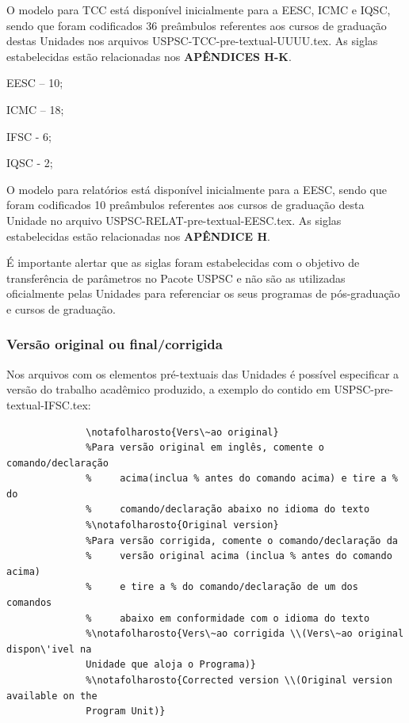 O modelo para TCC está disponível inicialmente para a EESC, ICMC e IQSC, sendo que foram codificados 36 preâmbulos referentes aos cursos de graduação destas Unidades nos arquivos USPSC-TCC-pre-textual-UUUU.tex. As siglas estabelecidas estão relacionadas nos \textbf{APÊNDICES H-K}.
				\begin{alineas}
					\item EESC – 10;
					\item  ICMC – 18;
					\item  IFSC - 6;
					\item  IQSC - 2;
				\end{alineas}	
	  						
O modelo para relatórios está disponível inicialmente para a EESC, sendo que foram codificados 10 preâmbulos referentes aos cursos de graduação desta Unidade no arquivo USPSC-RELAT-pre-textual-EESC.tex. As siglas estabelecidas estão relacionadas nos \textbf{APÊNDICE H}.

É importante alertar que as siglas foram estabelecidas com o objetivo de transferência de parâmetros no Pacote USPSC e não são as utilizadas oficialmente pelas Unidades para referenciar os seus programas de pós-graduação e cursos de graduação.

\subsubsection{Versão original ou final/corrigida}
Nos arquivos com os elementos pré-textuais das Unidades é possível especificar a versão do trabalho acadêmico produzido, a exemplo do contido em USPSC-pre-textual-IFSC.tex:	  
			  \begin{verbatim}
			  \notafolharosto{Vers\~ao original}
			  %Para versão original em inglês, comente o comando/declaração 
			  %     acima(inclua % antes do comando acima) e tire a % do 
			  %     comando/declaração abaixo no idioma do texto
			  %\notafolharosto{Original version} 
			  %Para versão corrigida, comente o comando/declaração da 
			  %     versão original acima (inclua % antes do comando acima) 
			  %     e tire a % do comando/declaração de um dos comandos 
			  %     abaixo em conformidade com o idioma do texto
			  %\notafolharosto{Vers\~ao corrigida \\(Vers\~ao original dispon\'ivel na
			  Unidade que aloja o Programa)}
			  %\notafolharosto{Corrected version \\(Original version available on the
			  Program Unit)}
			  \end{verbatim}
			  
